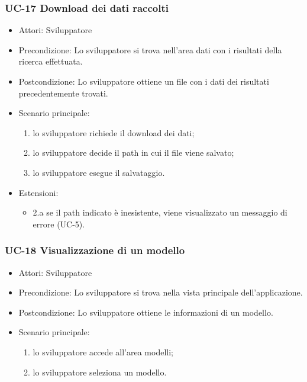 	\subsubsection{UC-17 Download dei dati raccolti}
		\begin{itemize}
			\item Attori: Sviluppatore
			\item Precondizione: Lo sviluppatore si trova nell'area dati con i risultati della ricerca effettuata.
			\item Postcondizione: Lo sviluppatore ottiene un file con i dati dei risultati precedentemente trovati.
			\item Scenario principale:
				\begin{enumerate}
					\item lo sviluppatore richiede il download dei dati;
					\item lo sviluppatore decide il path in cui il file viene salvato;
					\item lo sviluppatore esegue il salvataggio.
				\end{enumerate}
			\item Estensioni:
				\begin{itemize}
					\item 2.a se il path indicato è inesistente, viene visualizzato un messaggio di errore (UC-5).
				\end{itemize}
		\end{itemize} 

		
	\subsubsection{UC-18 Visualizzazione di un modello}
		\begin{itemize}
			\item Attori: Sviluppatore
			\item Precondizione: Lo sviluppatore si trova nella vista principale dell'applicazione.
			\item Postcondizione: Lo sviluppatore ottiene le informazioni di un modello.
			\item Scenario principale:
			\begin{enumerate}
				\item lo sviluppatore accede all'area modelli;
				\item lo sviluppatore seleziona un modello.
			\end{enumerate}
	\end{itemize}
	
